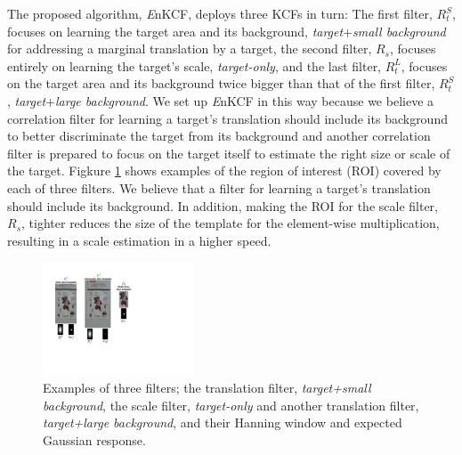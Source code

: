 \documentclass{bmvc2k}
\begin{document}
The proposed algorithm, {\it E}nKCF, deploys three KCFs in turn: The
first filter, $R_{t}^{S}$, focuses on learning the target area and its
background, \textit{target}+\textit{small background} for addressing a
marginal translation by a target, the second filter, $R_{s}$, focuses
entirely on learning the target's scale, \textit{target-only}, and the
last filter, $R_{t}^{L}$, focuses on the target area and its
background twice bigger than that of the first filter, $R_{t}^{S}$,
\textit{target}+\textit{large background}. We set up {\it E}nKCF in
this way because we believe a correlation filter for learning a
target's translation should include its background to better
discriminate the target from its background and another correlation
filter is prepared to focus on the target itself to estimate the right
size or scale of the target. Figkure \ref{fig:Filters} shows examples
of the region of interest (ROI) covered by each of three filters. We
believe that a filter for learning a target's translation should
include its background. In addition, making the ROI for the scale
filter, $R_{s}$, tighter reduces the size of the template for the
element-wise multiplication, resulting in a scale estimation in a
higher speed.

\begin{figure}[!h]
\centering
\includegraphics[width=0.4\textwidth]{figures/Filters_Details.pdf}
\caption{Examples of three filters; the translation filter,
  \textit{target+small background}, the scale filter,
  \textit{target-only} and another translation filter,
  \textit{target+large background}, and their Hanning window and
  expected Gaussian response.}
\label{fig:Filters}
\end{figure}
\end{document}
